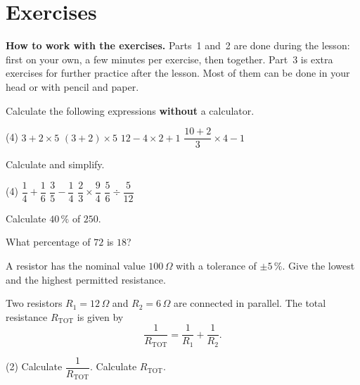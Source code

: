 
\section{Exercises}
\label{c1:sec:uppgifter}

\begin{aside}
\textbf{How to work with the exercises.} Parts~1 and~2 are done during the lesson: first on your
own, a few minutes per exercise, then together. Part~3 is extra exercises for further practice
after the lesson. Most of them can be done in your head or with pencil and paper.

\end{aside}


Calculate the following expressions \textbf{without} a calculator.
\begin{delar}(4)
  \task $3 + 2 \times 5$
  \task $(3 + 2) \times 5$
  \task $12 - 4 \times 2 + 1$
  \task $\dfrac{10 + 2}{3} \times 4 - 1$
\end{delar}

Calculate and simplify.
\begin{delar}(4)
  \task $\dfrac{1}{4} + \dfrac{1}{6}$
  \task $\dfrac{3}{5} - \dfrac{1}{4}$
  \task $\dfrac{2}{3} \times \dfrac{9}{4}$
  \task $\dfrac{5}{6} \div \dfrac{5}{12}$
\end{delar}

\begin{parts}
  \item Calculate $40\,\%$ of $250$.
  \item What percentage of $72$ is $18$?
  \item A resistor has the nominal value $100\,\Omega$ with a tolerance of $\pm 5\,\%$. Give the
    lowest and the highest permitted resistance.
\end{parts}


Two resistors $R_1 = 12\,\Omega$ and $R_2 = 6\,\Omega$ are connected in parallel. The total
resistance $R_{\text{TOT}}$ is given by
\[
  \frac{1}{R_{\text{TOT}}} = \frac{1}{R_1} + \frac{1}{R_2}.
\]
\begin{delar}(2)
  \task Calculate $\dfrac{1}{R_{\text{TOT}}}$.
  \task Calculate $R_{\text{TOT}}$.
\end{delar}

